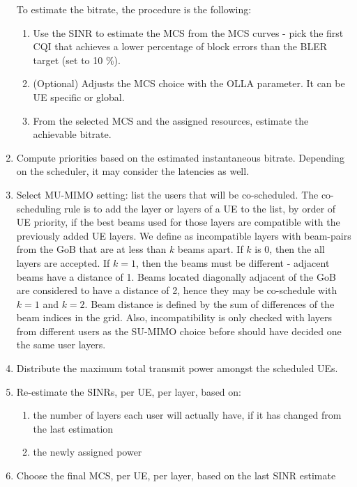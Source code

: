 \begin{enumerate}
    To estimate the bitrate, the procedure is the following:
    \begin{enumerate}
        \item Use the SINR to estimate the MCS from the \ac{MCS} curves - pick the first \ac{CQI} that achieves a lower percentage of block errors than the \ac{BLER} target (set to 10 \%).
        \item (Optional) Adjusts the \ac{MCS} choice with the \ac{OLLA} parameter. It can be UE specific or global.
        \item From the selected MCS and the assigned resources, estimate the achievable bitrate.
    \end{enumerate}
    \item Compute priorities based on the estimated instantaneous bitrate. Depending on the scheduler, it may consider the latencies as well.
    \item Select MU-MIMO setting: list the users that will be co-scheduled. The co-scheduling rule is to add the layer or layers of a UE to the list, by order of \ac{UE} priority, if the best beams used for those layers are compatible with the previously added \ac{UE} layers. We define as incompatible layers with beam-pairs from the \ac{GoB} that are at less than $k$ beams apart. If $k$ is 0, then the all layers are accepted. If $k = 1$, then the beams must be different - adjacent beams have a distance of 1. Beams located diagonally adjacent of the \ac{GoB} are considered to have a distance of 2, hence they may be co-schedule with $k=1$ and $k=2$. Beam distance is defined by the sum of differences of the beam indices in the grid.  Also, incompatibility is only checked with layers from different users as the SU-MIMO choice before should have decided one the same user layers.
    \item Distribute the maximum total transmit power amongst the scheduled UEs.
    \item Re-estimate the \acsp{SINR}, per \ac{UE}, per layer, based on:
    \begin{enumerate}
        \item the number of layers each user will actually have, if it has changed from the last estimation
        \item the newly assigned power
    \end{enumerate}
    \item Choose the final MCS, per UE, per layer, based on the last SINR estimate
\end{enumerate}




